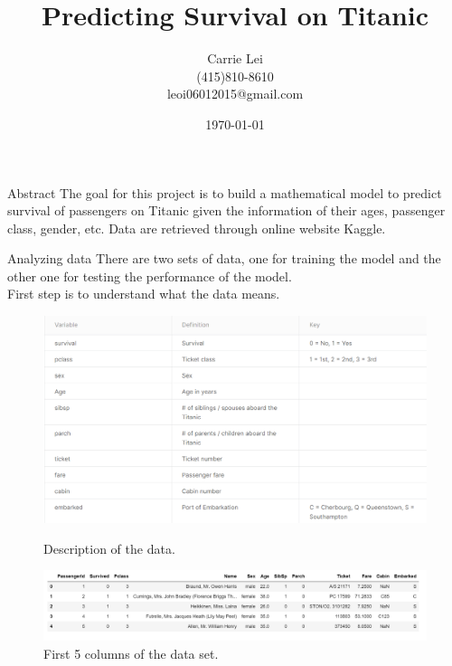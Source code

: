 \documentclass[a4paper,12pt]{article}
\title{Predicting Survival on Titanic}
\author{Carrie Lei\\ (415)810-8610\\leoi06012015@gmail.com} \date{\today}
\begin{document}
\maketitle

\justify

\begin{section}{Abstract}
The goal for this project is to build a mathematical model to predict survival
of passengers on Titanic given the information of their ages, passenger class,
gender, etc. Data are retrieved through online website Kaggle.




\end{section}


\begin{section}{Analyzing data}
There are two sets of data, one for training the model and the other one for testing the performance of the model.\\
First step is to understand what the data means.  \\

\begin{figure}
\includegraphics[scale=0.5]{titanice_data_preview.png}\\
	\caption{Description of the data.}
\end{figure}

\begin{figure}
  \includegraphics[width=\textwidth]{table_head.png}
	\caption{First 5 columns of the data set.}
\end{figure}





\end{section}
\end{document}
